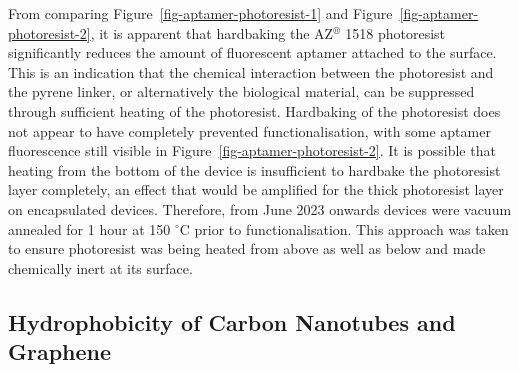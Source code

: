 \documentclass[
  a4paper,
]{scrbook}
\begin{document}
From comparing Figure~\ref{fig-aptamer-photoresist-1} and
Figure~\ref{fig-aptamer-photoresist-2}, it is apparent that hardbaking
the AZ\(^\circledR\) 1518 photoresist significantly reduces the amount
of fluorescent aptamer attached to the surface. This is an indication
that the chemical interaction between the photoresist and the pyrene
linker, or alternatively the biological material, can be suppressed
through sufficient heating of the photoresist. Hardbaking of the
photoresist does not appear to have completely prevented
functionalisation, with some aptamer fluorescence still visible in
Figure~\ref{fig-aptamer-photoresist-2}. It is possible that heating from
the bottom of the device is insufficient to hardbake the photoresist
layer completely, an effect that would be amplified for the thick
photoresist layer on encapsulated devices. Therefore, from June 2023
onwards devices were vacuum annealed for 1 hour at 150 \(^\circ\)C prior
to functionalisation. This approach was taken to ensure photoresist was
being heated from above as well as below and made chemically inert at
its surface.

\hypertarget{sec-hydrophobicity}{%
\subsection{Hydrophobicity of Carbon Nanotubes and
Graphene}\label{sec-hydrophobicity}}
\end{document}
